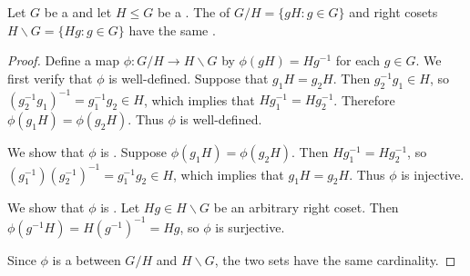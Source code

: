 \begin{proposition}
\label{proposition:left_and_right_cosets_of_a_subgroup_of_a_group_have_equal_cardinality}
Let $G$ be a  and let $H \leq G$ be a .
The  of  $G/H = \{gH : g \in G\}$ and right cosets $H\backslash G = \{Hg : g \in G\}$ have the same .
\end{proposition}

\begin{proof}
Define a map $\phi : G/H \to H\backslash G$ by $\phi(gH) = Hg^{-1}$ for each $g \in G$.
We first verify that $\phi$ is well-defined.
Suppose that $g_1 H = g_2 H$.
Then $g_2^{-1} g_1 \in H$, so $(g_2^{-1} g_1)^{-1} = g_1^{-1} g_2 \in H$, which implies that $Hg_1^{-1} = Hg_2^{-1}$. Therefore $\phi(g_1 H) = \phi(g_2 H)$.
Thus $\phi$ is well-defined.

We show that $\phi$ is .
Suppose $\phi(g_1 H) = \phi(g_2 H)$.
Then $Hg_1^{-1} = Hg_2^{-1}$, so $(g_1^{-1})(g_2^{-1})^{-1} = g_1^{-1} g_2 \in H$, which implies that $g_1 H = g_2 H$. Thus $\phi$ is injective.

We show that $\phi$ is .
Let $Hg \in H\backslash G$ be an arbitrary right coset.
Then $\phi(g^{-1} H) = H(g^{-1})^{-1} = Hg$, so $\phi$ is surjective.

Since $\phi$ is a  between $G/H$ and $H\backslash G$, the two sets have the same cardinality.
\end{proof}